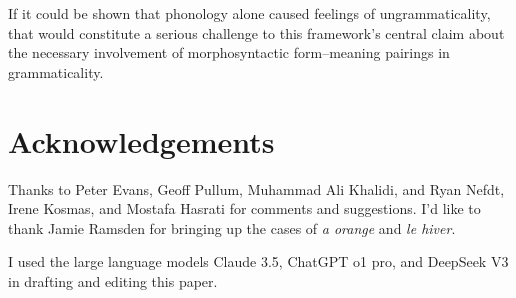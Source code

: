 \documentclass[12pt,letterpaper]{article}
\begin{document}
If it could be shown that phonology alone caused feelings of ungrammaticality, that would constitute a serious challenge to this framework's central claim about the necessary involvement of morphosyntactic form--meaning pairings in grammaticality.


\newpage
\section*{Acknowledgements}
Thanks to Peter Evans, Geoff Pullum, Muhammad Ali Khalidi, and Ryan Nefdt, Irene Kosmas, and Mostafa Hasrati for comments and suggestions. I'd like to thank Jamie Ramsden for bringing up the cases of \textit{a orange} and \textit{le hiver}.

I used the large language models Claude 3.5, ChatGPT o1 pro, and DeepSeek V3 in drafting and editing this paper.

\newpage
\begin{sloppypar}
\printbibliography[title=References]
\end{sloppypar}
\end{document}

